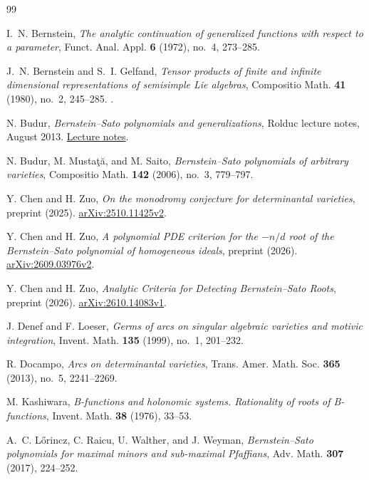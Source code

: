 \documentclass[11pt,a4paper]{article}
\numberwithin{equation}{section}
\theoremstyle{definition}
\begin{document}
{}
{}
\begin{thebibliography}{99}
\small

I.~N. Bernstein,
\emph{The analytic continuation of generalized functions with respect
to a parameter}, Funct. Anal. Appl. \textbf{6} (1972), no.~4, 273--285.


J.~N. Bernstein and S.~I. Gelfand,
\emph{Tensor products of finite and infinite dimensional representations
of semisimple Lie algebras},
Compositio Math. \textbf{41} (1980), no.~2, 245--285.
\href{https://www.numdam.org/item/CM_1980__41_2_245_0/}{}.

N. Budur,
\emph{Bernstein--Sato polynomials and generalizations},
Rolduc lecture notes, August 2013.
\href{https://www.math.rwth-aachen.de/~Viktor.Levandovskyy/filez/rolduc/Slides/NeroBudur/RolducNotes20130826.pdf}{Lecture notes}.

N. Budur, M. Musta\c t\u a, and M. Saito,
\emph{Bernstein--Sato polynomials of arbitrary varieties},
Compositio Math. \textbf{142} (2006), no.~3, 779--797.

Y. Chen and H. Zuo,
\emph{On the monodromy conjecture for determinantal varieties},
preprint (2025).
\href{https://arxiv.org/abs/2510.11425v2}{arXiv:2510.11425v2}.

Y. Chen and H. Zuo,
\emph{A polynomial PDE criterion for the $-n/d$ root of the
Bernstein--Sato polynomial of homogeneous ideals}, preprint (2026).
\href{https://arxiv.org/abs/2609.03976v2}{arXiv:2609.03976v2}.

Y. Chen and H. Zuo,
\emph{Analytic Criteria for Detecting Bernstein--Sato Roots},
preprint (2026).
\href{https://arxiv.org/abs/2610.14083v1}{arXiv:2610.14083v1}.

J. Denef and F. Loeser,
\emph{Germs of arcs on singular algebraic varieties and motivic integration},
Invent. Math. \textbf{135} (1999), no.~1, 201--232.


R. Docampo,
\emph{Arcs on determinantal varieties},
Trans. Amer. Math. Soc. \textbf{365} (2013), no.~5, 2241--2269.


M. Kashiwara,
\emph{B-functions and holonomic systems. Rationality of roots of
B-functions}, Invent. Math. \textbf{38} (1976), 33--53.


A.~C. L\H orincz, C. Raicu, U. Walther, and J. Weyman,
\emph{Bernstein--Sato polynomials for maximal minors and sub-maximal
Pfaffians}, Adv. Math. \textbf{307} (2017), 224--252.



\end{thebibliography}
\end{document}
